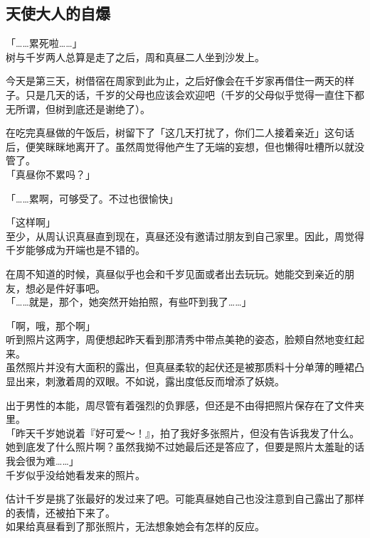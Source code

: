 \subsection{天使大人的自爆}

「……累死啦……」\\

树与千岁两人总算是走了之后，周和真昼二人坐到沙发上。

今天是第三天，树借宿在周家到此为止，之后好像会在千岁家再借住一两天的样子。只是几天的话，千岁的父母也应该会欢迎吧（千岁的父母似乎觉得一直住下都无所谓，但树到底还是谢绝了）。

在吃完真昼做的午饭后，树留下了「这几天打扰了，你们二人接着亲近」这句话后，便笑眯眯地离开了。虽然周觉得他产生了无端的妄想，但也懒得吐槽所以就没管了。\\

「真昼你不累吗？」

「……累啊，可够受了。不过也很愉快」

「这样啊」\\

至少，从周认识真昼直到现在，真昼还没有邀请过朋友到自己家里。因此，周觉得千岁能够成为开端也是不错的。

在周不知道的时候，真昼似乎也会和千岁见面或者出去玩玩。她能交到亲近的朋友，想必是件好事吧。\\

「……就是，那个，她突然开始拍照，有些吓到我了……」

「啊，哦，那个啊」\\

听到照片这两字，周便想起昨天看到那清秀中带点美艳的姿态，脸颊自然地变红起来。\\

虽然照片并没有大面积的露出，但真昼柔软的起伏还是被那质料十分单薄的睡裙凸显出来，刺激着周的双眼。不如说，露出度低反而增添了妖娆。

出于男性的本能，周尽管有着强烈的负罪感，但还是不由得把照片保存在了文件夹里。\\

「昨天千岁她说着『好可爱～！』，拍了我好多张照片，但没有告诉我发了什么。她到底发了什么照片啊？虽然我拗不过她最后还是答应了，但要是照片太羞耻的话我会很为难……」\\

千岁似乎没给她看发来的照片。

估计千岁是挑了张最好的发过来了吧。可能真昼她自己也没注意到自己露出了那样的表情，还被拍下来了。\\

如果给真昼看到了那张照片，无法想象她会有怎样的反应。

